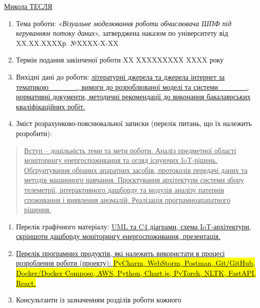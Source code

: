 \ul{Микола ТЕСЛЯ}

\begin{enumerate}
\def\labelenumi{\arabic{enumi}.}
\item
  Тема роботи: «\emph{Візуальне моделювання роботи обчислювача ШПФ під
  керуванням потоку даних}», затверджена наказом по університету від
  XX.XX.XXXXр. №XXXX-X-XX
\item
  Термін подання закінченої роботи XX XXXXXXXXX XXXX року
\item
  Вихідні дані до роботи: \ul{літературні джерела та джерела інтернет за
  тематикою \_\_\_\_\_, вимоги до розроблюваної моделі та системи
  \_\_\_\_\_, нормативні документи, методичні рекомендації до виконання
  бакалаврських кваліфікаційних робіт.}
\item
  Зміст розрахунково-пояснювальної записки (перелік питань, що їх
  належить розробити):
\end{enumerate}

\begin{quote}
\ul{Вступ -- доцільність теми та мети роботи. Аналіз предметної області
моніторингу енергоспоживання та огляд існуючих IoT-рішень. Обґрунтування
обраних апаратних засобів, протоколів передачі даних та методів
машинного навчання. Проєктування архітектури системи збору телеметрії,
інтерактивного дашборду та модулів аналізу патернів споживання і
виявлення аномалій. Реалізація програмноапаратного рішення.}
\end{quote}

\begin{enumerate}
\def\labelenumi{\arabic{enumi}.}
\setcounter{enumi}{4}
\item
  Перелік графічного матеріалу: \ul{UML та C4 діаграми, схема
  IoT-архітектури, скріншоти дашборду моніторингу енергоспоживання,
  презентація.}
\item
  \ul{Перелік програмних продуктів, які належить використати в процесі
  розроблення роботи (проекту): \hl{PyCharm, WebStorm, Postman,
  Git/GitHub, Docker/Docker Compose, AWS, Python, Chart.js, PyTorch,
  NLTK, FastAPI, React.}}
\item
  Консультанти із зазначенням розділів роботи кожного
\end{enumerate}

